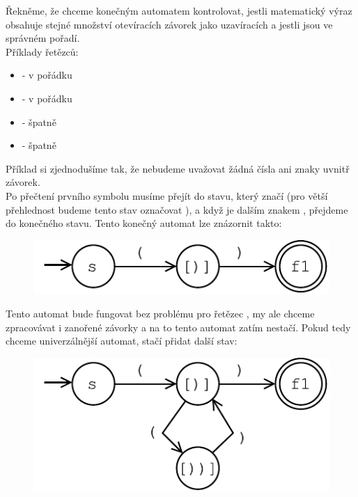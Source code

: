 \begin{exmp}
  \label{exmp:brackets}

  Řekněme, že chceme konečným automatem kontrolovat,
  jestli matematický výraz obsahuje stejné množství
  otevíracích závorek jako uzavíracích a jestli jsou ve správném pořadí.\\
  Příklady řetězců:
  \begin{itemize}
    \item \symb{(())} - v pořádku
    \item \symb{(()())} - v pořádku
    \item \symb{(()} - špatně
    \item \symb{)(} - špatně
  \end{itemize}

  Příklad si zjednodušíme tak, že nebudeme uvažovat žádná čísla ani znaky uvnitř
  závorek.\\

  Po přečtení prvního symbolu \symb{(} musíme přejít do stavu, který značí
   (pro větší přehlednost budeme tento stav označovat \symb{[)]}),
  a když je dalším znakem \symb{)}, přejdeme do konečného stavu.
  Tento konečný automat lze znázornit takto:

  \begin{figure}[H]
    \centering
    \includegraphics{fig/finiteAutomat2.pdf}
  \end{figure}

  Tento automat bude fungovat bez problému pro řetězec \symb{()},
  my ale chceme zpracovávat i zanořené závorky a na to tento automat zatím nestačí.
  Pokud tedy chceme univerzálnější automat, stačí přidat další stav:

  \begin{figure}[H]
    \centering
    \includegraphics{fig/finiteAutomat2_1.pdf}
  \end{figure}


\end{exmp}
